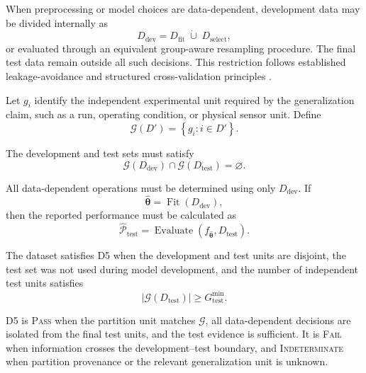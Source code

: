 \documentclass[11pt,a4paper]{article}
\begin{document}
When preprocessing or model choices are data-dependent, development data may
be divided internally as
\begin{equation}
    D_{\mathrm{dev}}
    =
    D_{\mathrm{fit}}
    \;\dot{\cup}\;
    D_{\mathrm{select}},
\end{equation}
or evaluated through an equivalent group-aware resampling procedure. The final
test data remain outside all such decisions. This restriction follows
established leakage-avoidance and structured cross-validation principles
\cite{kaufman2011,roberts2017}.

Let $g_i$ identify the independent experimental unit required by the
generalization claim, such as a run, operating condition, or physical sensor
unit. Define
\begin{equation}
    \mathcal{G}(D')
    =
    \left\{
        g_i :
        i\in D'
    \right\}.
\end{equation}

The development and test sets must satisfy
\begin{equation}
    \mathcal{G}(D_{\mathrm{dev}})
    \cap
    \mathcal{G}(D_{\mathrm{test}})
    =
    \varnothing.
\end{equation}

All data-dependent operations must be determined using only
$D_{\mathrm{dev}}$. If
\begin{equation}
    \widehat{\boldsymbol{\theta}}
    =
    \operatorname{Fit}(D_{\mathrm{dev}}),
\end{equation}
then the reported performance must be calculated as
\begin{equation}
    \widehat{\mathcal{P}}_{\mathrm{test}}
    =
    \operatorname{Evaluate}
    \left(
        f_{\widehat{\boldsymbol{\theta}}},
        D_{\mathrm{test}}
    \right).
\end{equation}

The dataset satisfies D5 when the development and test units are disjoint, the
test set was not used during model development, and the number of independent
test units satisfies
\begin{equation}
    \left|
        \mathcal{G}(D_{\mathrm{test}})
    \right|
    \geq
    G_{\mathrm{test}}^{\min}.
\end{equation}

D5 is \textsc{Pass} when the partition unit matches $\mathcal{G}$, all
data-dependent decisions are isolated from the final test units, and the test
evidence is sufficient. It is \textsc{Fail} when information crosses the
development--test boundary, and \textsc{Indeterminate} when partition
provenance or the relevant generalization unit is unknown.
\end{document}
